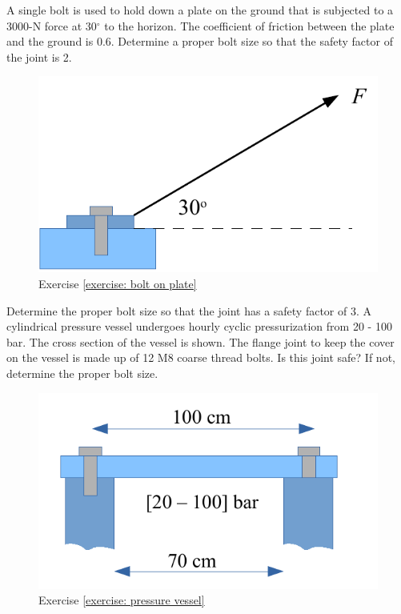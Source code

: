 \documentclass[
10pt,
a4paper,
openany,
svgnames,
]{book}
\newcommand{\exercise}{%
\item \label{lab:\arabic{chapter}-\arabic{exercisesi}}  %
}
\begin{document}
\begin{exercises}
  \exercise \label{exercise: bolt on plate} A single bolt is used to hold down a plate on the ground that is subjected to a 3000-N force at 30$^{\circ}$ to the horizon. The coefficient of friction between the plate and the ground is 0.6. Determine a proper bolt size so that the safety factor of the joint is 2.
  
  \begin{figure}[H]
    \centering
    \includegraphics[scale=0.6]{pictures/Bolt/bolt-on-plate-exercise}
    \caption{Exercise \ref{exercise: bolt on plate}}
  \end{figure}
  
  \exercise \label{exercise: pressure vessel} Determine the proper bolt size so that the joint has a safety factor of 3. A cylindrical pressure vessel undergoes hourly cyclic pressurization from 20 - 100 bar. The cross section of the vessel is shown. The flange joint to keep the cover on the vessel is made up of 12 M8 coarse thread bolts. Is this joint safe? If not, determine the proper bolt size.
  
  \begin{figure}[H]
    \centering
    \includegraphics[scale=0.6]{pictures/Bolt/pressure-vessel-exercise}
    \caption{Exercise \ref{exercise: pressure vessel}}
  \end{figure}


\end{exercises}
\end{document}
